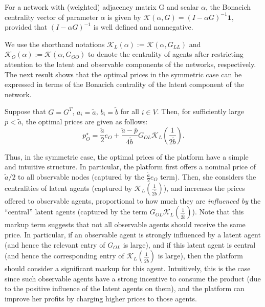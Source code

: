 \documentclass[opre,nonblindrev]{informs3} %
\begin{document}
\begin{definition}
	For a network with (weighted) adjacency matrix G and scalar $\alpha$, the Bonacich centrality vector of parameter $\alpha$ is given by
	$\mathcal{K}(\alpha,G)=(I-\alpha G)^{-1} \mathbf{1}$,
	provided that $(I-\alpha G)^{-1}$ is well defined and nonnegative.
\end{definition}
We use the shorthand notations $\mathcal{K}_L(\alpha):= \mathcal{K}(\alpha, G_{LL})$ and $\mathcal{K}_O(\alpha):=\mathcal{K}(\alpha, G_{OO})$ to  denote the centrality of agents after restricting attention to the latent and observable components of the networks, respectively.
The next result shows that the optimal prices in the symmetric case can be expressed in terms of  the Bonacich centrality of the latent component of the network.
\begin{corollary}\label{prop:symCase}
		Suppose that   $G=G^T$,
		$a_i=\tilde a$, $b_i=\tilde b$ for all $i\in V$.
	Then, for sufficiently large
	$\bar p < \tilde a$, the optimal prices are given as follows:
	\begin{equation*}{p}_O^\star=
	\frac{\tilde a}{2}{e}_O+
	\frac{\tilde a-\bar{p}}{4\tilde b}
	G_{OL} \mathcal{K}_L\left(\frac{1}{2\tilde b}\right)
	.
	\end{equation*}
\end{corollary}

Thus, in the symmetric case, the optimal prices of the platform have a simple and intuitive structure. In particular, the platform
first offers a nominal price of $\tilde a/2$ to all observable nodes (captured by the $\frac{\tilde a}{2} {e}_O$ term).
Then, she
considers the centralities of latent agents (captured by $\mathcal{K}_L(\frac{1}{2\tilde b})$), and increases the prices offered to observable agents, proportional to how much they are \emph{influenced by} the ``central'' latent agents  (captured by the term $G_{OL}
\mathcal{K}_L\left(\frac{1}{2\tilde b}\right)$). Note that this markup term suggests that not all observable agents should receive the same price. In particular, if an observable agent is strongly influenced by a latent agent (and hence the relevant entry of $G_{OL}$ is large), and if this latent agent is central (and hence the corresponding entry of $\mathcal{K}_L(\frac{1}{2\tilde b})$ is large), then the platform should consider a significant markup for this agent.
Intuitively, this is the case since
such observable agents have a strong incentive to consume the product (due to the positive  influence of the latent agents on them), and the platform can
improve her profits by charging higher prices to those agents.
\end{document}

